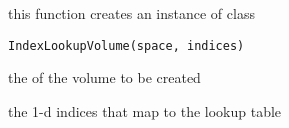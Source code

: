 \begin{Description}\relax
this function creates an instance of class 
\end{Description}
\begin{Usage}
\begin{verbatim}
IndexLookupVolume(space, indices)
\end{verbatim}
\end{Usage}
\begin{Arguments}
\begin{ldescription}
\item[\code{space}] the  of the volume to be created 
\item[\code{indices}] the 1-d indices that map to the lookup table 
\end{ldescription}
\end{Arguments}

